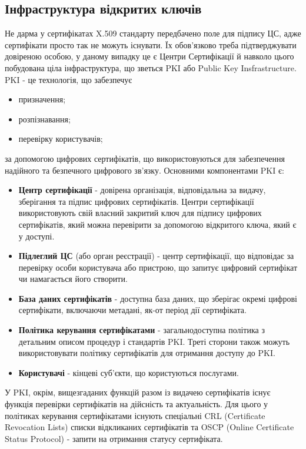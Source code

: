 \subsection{Інфраструктура відкритих ключів}
 Не дарма у сертифікатах X.509 стандарту передбачено поле для підпису ЦС, адже сертифікати просто так не можуть існувати. Їх обов'язково треба підтверджувати довіреною особою, у даному випадку це є Центри Сертифікації й навколо цього побудована ціла інфраструктура, що зветься PKI або Public Key Insfrastructure. PKI - це технологія, що забезпечує
 \begin{itemize}
     \item призначення;
     \item розпізнавання;
     \item перевірку користувачів;
 \end{itemize}
 за допомогою цифрових сертифікатів, що використовуються для забезпечення надійного та безпечного цифрового зв'язку.
 Основними компонентами PKI є:
 \begin{itemize}
     \item \textbf{Центр сертифікації} - довірена організація, відповідальна за видачу, зберігання та підпис цифрових сертифікатів. Центри сертифікації використовують свій власний закритий ключ для підпису цифрових сертифікатів, який можна перевірити за допомогою відкритого ключа, який є у доступі.
     \item \textbf{Підлеглий ЦС} (або орган реєстрації) - центр сертифікації, що відповідає за перевірку особи користувача або пристрою, що запитує цифровий сертифікат чи намагається його створити.
     \item \textbf{База даних сертифікатів} - доступна база даних, що зберігає окремі цифрові сертифікати, включаючи метадані, як-от період дії сертифіката.
     \item \textbf{Політика керування сертифікатами} - загальнодоступна політика з детальним описом процедур і стандартів PKI. Треті сторони також можуть використовувати політику сертифікатів для отримання доступу до PKI.
     \item \textbf{Користувачі} - кінцеві суб'єкти, що користуються послугами.
 \end{itemize}
У PKI, окрім, вищезгаданих функцій разом із видачею сертифікатів існує функція перевірки сертифікатів на дійсність та актуальність. Для цього у політиках керування сертифікатами існують спеціальні CRL (Certificate Revocation Lists) списки відкликаних сертифікатів та OSCP (Online Certificate Status Protocol) - запити на отримання статусу сертифіката.
